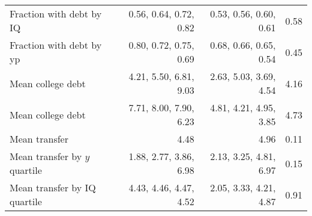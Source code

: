 \begin{tabular}{lrrr}
Fraction with debt by IQ & 0.56, 0.64, 0.72, 0.82  & 0.53, 0.56, 0.60, 0.61  & 0.58  \\ 
Fraction with debt by yp & 0.80, 0.72, 0.75, 0.69  & 0.68, 0.66, 0.65, 0.54  & 0.45  \\ 
Mean college debt & 4.21, 5.50, 6.81, 9.03  & 2.63, 5.03, 3.69, 4.54  & 4.16  \\ 
Mean college debt & 7.71, 8.00, 7.90, 6.23  & 4.81, 4.21, 4.95, 3.85  & 4.73  \\ 
Mean transfer & 4.48  & 4.96  & 0.11  \\ 
Mean transfer by $y$ quartile & 1.88, 2.77, 3.86, 6.98  & 2.13, 3.25, 4.81, 6.97  & 0.15  \\ 
Mean transfer by IQ quartile & 4.43, 4.46, 4.47, 4.52  & 2.05, 3.33, 4.21, 4.87  & 0.91  \\ 
\hline
\end{tabular}%
